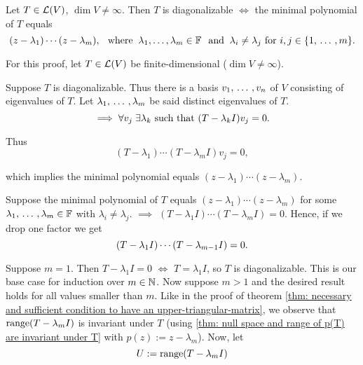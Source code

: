 \setcounter{thm}{61}
\begin{thm}
  \label{thm: necessary and sufficient condition for diagonalizability}
  Let $T\in \mathcal{L} (V)$, $\dim V \neq \infty$. Then $T$ is diagonalizable $\iff$ the minimal polynomial of $T$ equals
  \begin{equation}
    (z-\lambda_1) \cdots (z-\lambda_m), \where \lambda_1, \dots, \lambda_m \in \myF \myand \lambda_i \neq  \lambda_j $ for $ i,j \in \{1, \ddd, m \}.
  \end{equation}
\end{thm}
\begin{prf} For this proof, let $T\in \mathcal{L} (V)$ be finite-dimensional ($\dim V \neq \infty$).

  \Rightarrowdirection Suppose $T$ is diagonalizable. Thus there is a basis $v_1, {\, \ldots \,\,}, v_n$ of $V$ consisting of eigenvalues of $T$.  Let $\lambda_1, {\, \ldots \,\,}, \lambda_m$ be said distinct eigenvalues of $T$. %
  \begin{equation}
    \implies \forall v_j \; \exists \lambda_k $ \st $ (T-\lambda_k I)v_j = 0.
  \end{equation}

  Thus
  \begin{equation}
    (T-\lambda_1) \cdots (T-\lambda_m I)v_j =0,
  \end{equation}

  which implies the minimal polynomial equals $(z-\lambda_1)\cdots(z-\lambda_m).$

  \Leftarrowdirection Suppose the minimal polynomial of $T$ equals $(z-\lambda_1) \cdots (z-\lambda_m)$ for some $\lambda_1, {\, \ldots \,\,}, \lambda_m \in  \mathbb{F}$ with $\lambda_i \neq \lambda_j$.
  $\implies$ $(T-\lambda_1 I) \cdots (T-\lambda_m I)=0.$ Hence, if we drop one factor we get
  \begin{equation}
    \label{eq: (t-l1 I)***(t-l_{m-1}I)=0}
    (T-\lambda_1 I) \cdots (T-\lambda_{m-1} I)=0.
  \end{equation}

  Suppose $m=1$. Then $T-\lambda_1 I = 0$ $\iff$ $T=\lambda_1 I$, so $T$ is diagonalizable. This is our base case for induction over $m \in \mathbb{N}$.
  Now suppose $m>1$ and the desired result holds for all values smaller than $m$. Like in the proof of theorem \ref{thm: necessary and sufficient condition to have an upper-triangular-matrix}, we observe that $\operatorname{range} (T-\lambda_m I)$ is invariant under $T$ (using \ref{thm: null space and range of p(T) are invariant under T} with $p(z) := z-\lambda_m$). Now, let
  \begin{equation}
    \label{eq: 2nd definition of U}
    U := \operatorname{range}(T - \lambda_m I)
  \end{equation}


\end{prf}
